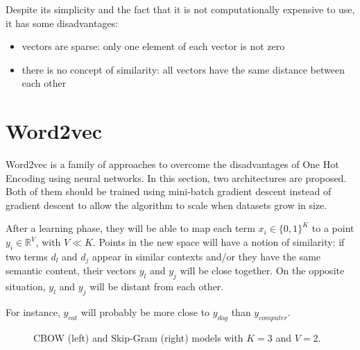 Despite its simplicity and the fact that it is not computationally expensive to use, it has some disadvantages:
\begin{itemize}
    \item vectors are sparse: only one element of each vector is not zero
    \item there is no concept of similarity: all vectors have the same distance between each other
\end{itemize}

\section{Word2vec}
Word2vec is a family of approaches to overcome the disadvantages of One Hot Encoding using neural networks.
In this section, two architectures are proposed.
Both of them should be trained using mini-batch gradient descent instead of gradient descent to allow the algorithm to scale when datasets grow in size.

After a learning phase, they will be able to map each term $x_i \in \{0, 1\}^K$ to a point $y_i \in \mathbb{R}^V$, with $V \ll K$.
Points in the new space will have a notion of similarity:
if two terms $d_l$ and $d_j$ appear in similar contexts and/or they have the same semantic content,
their vectors $y_l$ and $y_j$ will be close together.
On the opposite situation, $y_l$ and $y_j$ will be distant from each other.

For instance, $y_{cat}$ will probably be more close to $y_{dog}$ than $y_{computer}$.

\begin{figure}[h]
    \centering
    \hfill
    \caption{CBOW (left) and Skip-Gram (right) models with $K=3$ and $V=2$.}
    \label{fig:nnwemb}
\end{figure}

